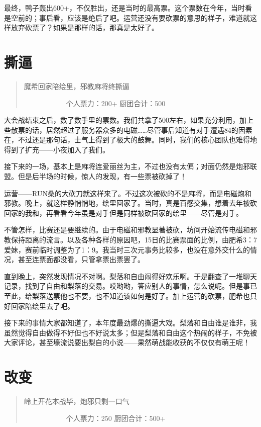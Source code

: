 最终，鸭子轰出600+，不仅胜出，还是当时的最高票。这个票数在今年，当时看是空前的；事后看，应该是绝后了吧。运营还没有要砍票的意思的样子，难道就这样放弃砍票了？如果是那样的话，那真是太好了。


\chapter{撕逼}
\begin{quote}
魔希回家陪绘里，邪教麻将终撕逼

　　　　　　个人票力：200+ 厨团合计：500
\end{quote}

大会战结束之后，数了数手里的票数。我们共拿了500左右，如果充分利用，加上些散票的话，居然超过了服务器众多的电磁……尽管事后知道有对手遭遇84的因素在，不过还是那句话，士气上得到了极大的鼓舞。同时，我们的核心团队也难得地得到了扩充——小夜加入了我们。

接下来的一场，基本上是麻将连爱丽丝为主，不过也没有太偏；对面仍然是炮邪联盟。但是后半场的时候，惊人的发现，有一些票被砍掉了！

运营——RUN桑的大砍刀就这样来了。不过这次被砍的不是麻将，而是电磁炮和邪教。晚上，就这样静悄悄地，绘里回家了。当时，真是百感交集，想着去年被砍回家的我和，再看看今年虽是对手但是同样被砍回家的绘里——尽管是对手。

不管怎样，比赛还是要继续的。由于电磁和邪教显著被砍，坊间开始流传电磁和邪教保持距离的流言。以及各种各样的原因吧，15日的比赛票面的比例，由肥希3：7爱妹，赛前临时调整为了1：9。我当时三次元事务比较多，也没在意外交什么的情况，甚至连票面都没看，只管拿票出票罢了。

直到晚上，突然发现情况不对啊。梨落和自由闹得好欢乐啊。于是翻查了一堆聊天记录，找到了自由和梨落的交易。哎哟哟，答应别人的事情，怎么说呢。但是事已至此，给梨落送票他也不要，也不知道该如何是好了。加上运营的砍票，肥希也只好回家陪绘里去了吧。

接下来的事情大家都知道了，本年度最劲爆的撕逼大戏。梨落和自由谁是谁非，我虽然觉得自由做得不好但也不好说太多；但是梨落和自由这个热闹的样子，不免被大家评论，甚至壕流说要出梨自的小说——果然萌战能收获的不仅仅有萌王呢！


\chapter{改变}
\begin{quote}
岭上开花本战毕，炮邪只剩一口气

　　　　　　个人票力：250 厨团合计：500+
\end{quote}

